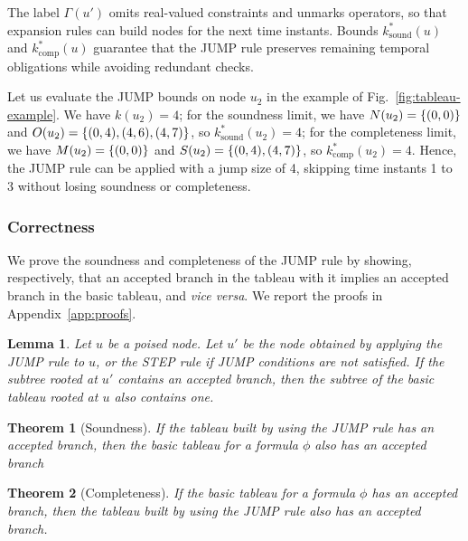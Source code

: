 \documentclass{easychair}
\newtheorem{theorem}{Theorem}
\newtheorem{lemma}{Lemma}
\begin{document}
The label $\Gamma(u')$ omits real-valued constraints and unmarks operators, so that expansion rules can build nodes for the next time instants.
Bounds $k^{\ast}_{\text{sound}}(u)$ and $k^{\ast}_{\text{comp}}(u)$ guarantee that the \textsf{JUMP} rule preserves remaining temporal obligations while avoiding redundant checks.

Let us evaluate the \textsf{JUMP} bounds on node $u_2$ in the example of Fig.~\ref{fig:tableau-example}.
We have $k(u_2) = 4$; for the soundness limit, we have $N(u_2) = \{ (0,0) \}$ and $O(u_2) = \{ (0,4), (4,6), (4,7) \}$, so $k^{\ast}_{\text{sound}}(u_2) = 4$; for the completeness limit, we have $M(u_2) = \{ (0,0) \}$ and $S(u_2) = \{ (0,4), (4,7) \}$, so $k^{\ast}_{\text{comp}}(u_2) = 4$.
Hence, the \textsf{JUMP} rule can be applied with a jump size of 4, skipping time instants 1 to 3 without losing soundness or completeness.

\subsubsection{Correctness}

We prove the soundness and completeness of the \textsf{JUMP} rule by showing, respectively, that an accepted branch in the tableau with it implies an accepted branch in the basic tableau, and \emph{vice versa}.
We report the proofs in Appendix~\ref{app:proofs}.

\begin{lemma}
    \label{lemma:jump-sound}
    Let $u$ be a poised node. Let $u'$ be the node obtained by applying the JUMP rule to $u$, or the STEP rule if JUMP conditions are not satisfied. If the subtree rooted at $u'$ contains an accepted branch, then the subtree of the basic tableau rooted at $u$ also contains one.
\end{lemma}

\begin{theorem}[Soundness]
    \label{thm:jump-sound}
    If the tableau built by using the \textsf{JUMP} rule has an accepted branch, then the basic tableau for a formula $\phi$ also has an accepted branch
\end{theorem}

\begin{theorem}[Completeness]
    \label{thm:jump-complete}
    If the basic tableau for a formula $\phi$ has an accepted branch, then the tableau built by using the \textsf{JUMP} rule also has an accepted branch.
\end{theorem}
\end{document}
